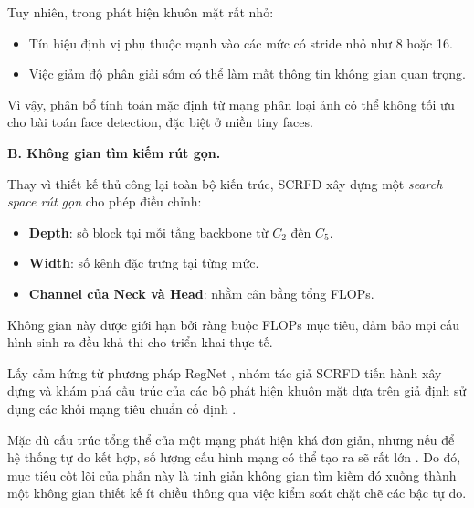 Tuy nhiên, trong phát hiện khuôn mặt rất nhỏ:

\begin{itemize}
  \item Tín hiệu định vị phụ thuộc mạnh vào các mức có stride nhỏ như 8 hoặc 16.
  \item Việc giảm độ phân giải sớm có thể làm mất thông tin không gian quan trọng.
\end{itemize}

Vì vậy, phân bổ tính toán mặc định từ mạng phân loại ảnh có thể không tối ưu cho bài toán face detection, đặc biệt ở miền tiny faces.

\medskip
\noindent\textbf{B. Không gian tìm kiếm rút gọn.}

Thay vì thiết kế thủ công lại toàn bộ kiến trúc, SCRFD xây dựng một \textit{search space rút gọn} cho phép điều chỉnh:

\begin{itemize}
  \item \textbf{Depth}: số block tại mỗi tầng backbone từ $C_2$ đến $C_5$.
  \item \textbf{Width}: số kênh đặc trưng tại từng mức.
  \item \textbf{Channel của Neck và Head}: nhằm cân bằng tổng FLOPs.
\end{itemize}

Không gian này được giới hạn bởi ràng buộc FLOPs mục tiêu, đảm bảo mọi cấu hình sinh ra đều khả thi cho triển khai thực tế.

\medskip
Lấy cảm hứng từ phương pháp RegNet \cite{guo2022scrfd}, nhóm tác giả SCRFD tiến hành xây dựng và khám phá cấu trúc của các bộ phát hiện khuôn mặt dựa trên giả định sử dụng các khối mạng tiêu chuẩn cố định \cite{guo2022scrfd}.

Mặc dù cấu trúc tổng thể của một mạng phát hiện khá đơn giản, nhưng nếu để hệ thống tự do kết hợp, số lượng cấu hình mạng có thể tạo ra sẽ rất lớn \cite{guo2022scrfd}. Do đó, mục tiêu cốt lõi của phần này là tinh giản không gian tìm kiếm đó xuống thành một không gian thiết kế ít chiều thông qua việc kiểm soát chặt chẽ các bậc tự do.

